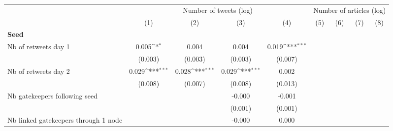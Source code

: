 {
\def\sym#1{\ifmmode^{#1}\else\(^{#1}\)\fi}
\begin{tabular}{l*{8}{c}}
\hline\hline
                    &\multicolumn{4}{c}{Number of tweets (log)}                                             &\multicolumn{4}{c}{Number of articles (log)}                                           \\\cmidrule(lr){2-5}\cmidrule(lr){6-9}
                    &\multicolumn{1}{c}{(1)}         &\multicolumn{1}{c}{(2)}         &\multicolumn{1}{c}{(3)}         &\multicolumn{1}{c}{(4)}         &\multicolumn{1}{c}{(5)}         &\multicolumn{1}{c}{(6)}         &\multicolumn{1}{c}{(7)}         &\multicolumn{1}{c}{(8)}         \\
\hline
\textbf{Seed}       &                     &                     &                     &                     &                     &                     &                     &                     \\
Nb of retweets day 1&       0.005\sym{*}  &       0.004         &       0.004         &       0.019\sym{***}&                     &                     &                     &                     \\
                    &     (0.003)         &     (0.003)         &     (0.003)         &     (0.007)         &                     &                     &                     &                     \\
Nb of retweets day 2&       0.029\sym{***}&       0.028\sym{***}&       0.029\sym{***}&       0.002         &                     &                     &                     &                     \\
                    &     (0.008)         &     (0.007)         &     (0.008)         &     (0.013)         &                     &                     &                     &                     \\
Nb gatekeepers following seed&                     &                     &      -0.000         &      -0.001         &                     &                     &                     &                     \\
                    &                     &                     &     (0.001)         &     (0.001)         &                     &                     &                     &                     \\
Nb linked gatekeepers through 1 node&                     &                     &      -0.000         &       0.000         &                     &                     &                     &                     \\

\end{tabular}}
